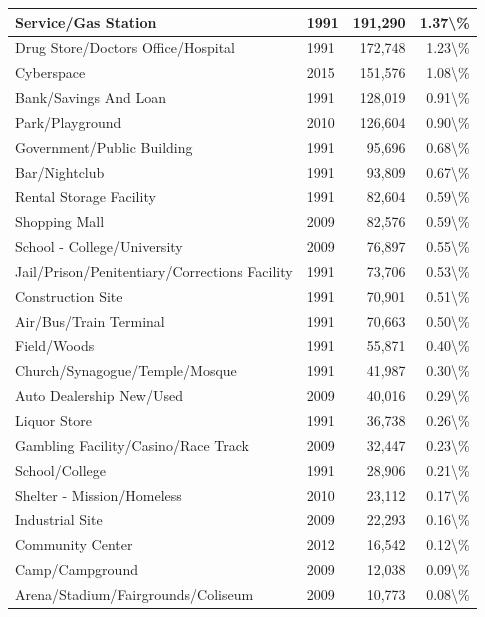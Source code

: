 \documentclass[
]{krantz}
\begin{document}
\begin{longtable}[t]{l|l|r|r}
Service/Gas Station & 1991 & 191,290 & 1.37\textbackslash{}\%\\
\hline
Drug Store/Doctors Office/Hospital & 1991 & 172,748 & 1.23\textbackslash{}\%\\
\hline
Cyberspace & 2015 & 151,576 & 1.08\textbackslash{}\%\\
\hline
Bank/Savings And Loan & 1991 & 128,019 & 0.91\textbackslash{}\%\\
\hline
Park/Playground & 2010 & 126,604 & 0.90\textbackslash{}\%\\
\hline
Government/Public Building & 1991 & 95,696 & 0.68\textbackslash{}\%\\
\hline
Bar/Nightclub & 1991 & 93,809 & 0.67\textbackslash{}\%\\
\hline
Rental Storage Facility & 1991 & 82,604 & 0.59\textbackslash{}\%\\
\hline
Shopping Mall & 2009 & 82,576 & 0.59\textbackslash{}\%\\
\hline
School - College/University & 2009 & 76,897 & 0.55\textbackslash{}\%\\
\hline
Jail/Prison/Penitentiary/Corrections Facility & 1991 & 73,706 & 0.53\textbackslash{}\%\\
\hline
Construction Site & 1991 & 70,901 & 0.51\textbackslash{}\%\\
\hline
Air/Bus/Train Terminal & 1991 & 70,663 & 0.50\textbackslash{}\%\\
\hline
Field/Woods & 1991 & 55,871 & 0.40\textbackslash{}\%\\
\hline
Church/Synagogue/Temple/Mosque & 1991 & 41,987 & 0.30\textbackslash{}\%\\
\hline
Auto Dealership New/Used & 2009 & 40,016 & 0.29\textbackslash{}\%\\
\hline
Liquor Store & 1991 & 36,738 & 0.26\textbackslash{}\%\\
\hline
Gambling Facility/Casino/Race Track & 2009 & 32,447 & 0.23\textbackslash{}\%\\
\hline
School/College & 1991 & 28,906 & 0.21\textbackslash{}\%\\
\hline
Shelter - Mission/Homeless & 2010 & 23,112 & 0.17\textbackslash{}\%\\
\hline
Industrial Site & 2009 & 22,293 & 0.16\textbackslash{}\%\\
\hline
Community Center & 2012 & 16,542 & 0.12\textbackslash{}\%\\
\hline
Camp/Campground & 2009 & 12,038 & 0.09\textbackslash{}\%\\
\hline
Arena/Stadium/Fairgrounds/Coliseum & 2009 & 10,773 & 0.08\textbackslash{}\%\\

\end{longtable}
\end{document}
